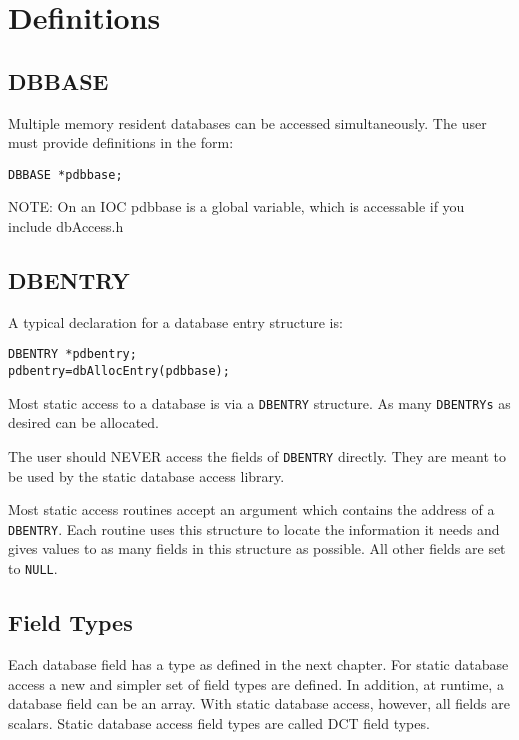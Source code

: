 \section{Definitions}

\subsection{DBBASE}

Multiple memory resident databases can be accessed simultaneously. The user must provide definitions in the form:

\begin{verbatim}
DBBASE *pdbbase;
\end{verbatim}

NOTE: On an IOC pdbbase is a global variable, which is accessable if you include dbAccess.h

\subsection{DBENTRY}

A typical declaration for a database entry structure is:

\begin{verbatim}
DBENTRY *pdbentry;
pdbentry=dbAllocEntry(pdbbase);
\end{verbatim}

Most static access to a database is via a \verb|DBENTRY| structure. As many \verb|DBENTRYs| as desired can be allocated.

The user should NEVER access the fields of \verb|DBENTRY| directly. They are meant to be used by the static database access 
library.

Most static access routines accept an argument which contains the address of a \verb|DBENTRY|. Each routine uses this structure 
to locate the information it needs and gives values to as many fields in this structure as possible. All other fields are set to 
\verb|NULL|.

\subsection{Field Types}

Each database field has a type as defined in the next chapter. For static database access a new and simpler set of field 
types are defined. In addition, at runtime, a database field can be an array. With static database access, however, all fields 
are scalars. Static database access field types are called DCT field types.

